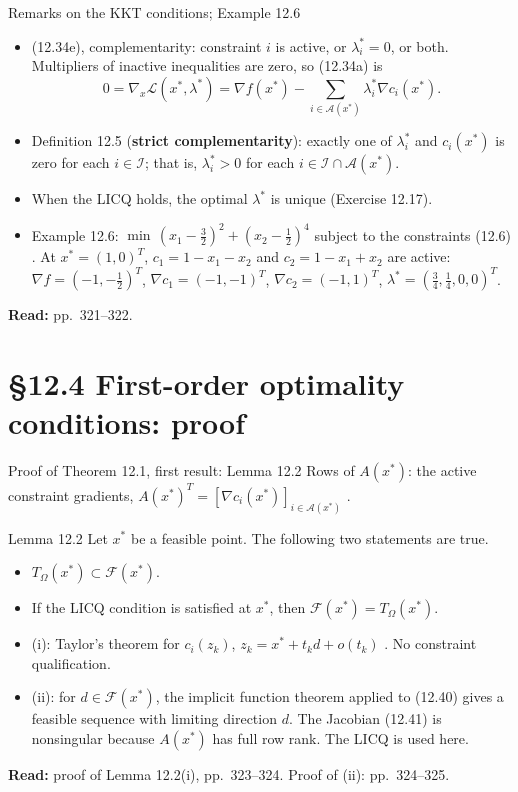 \documentclass[aspectratio=169,12pt]{beamer}
\newcommand{\xs}{x^{*}}
\newcommand{\gradf}{\nabla f}
\newcommand{\eqn}[1]{\text{\small(#1)}}
\newcommand{\readbook}[1]{{\color{red}\textbf{Read:} #1}}
\newcommand{\ls}{\lambda^{*}}
\newcommand{\cA}{\mathcal{A}}
\newcommand{\cF}{\mathcal{F}}
\newcommand{\cI}{\mathcal{I}}
\newcommand{\cL}{\mathcal{L}}
\newcommand{\TO}{T_{\Omega}}
\begin{document}
\begin{frame}{Remarks on the KKT conditions; Example 12.6}
  \begin{itemize}\setlength\itemsep{0.25em}
    \item (12.34e), complementarity: constraint $i$ is active, or $\ls_{i}=0$, or both. Multipliers of
      inactive inequalities are zero, so (12.34a) is
      \[ 0=\nabla_{x}\cL(\xs,\ls)=\gradf(\xs)-\sum_{i\in\cA(\xs)}\ls_{i}\nabla c_{i}(\xs) . \tag{12.35} \]
    \item Definition 12.5 (\textbf{strict complementarity}): exactly one of $\ls_{i}$ and $c_{i}(\xs)$
      is zero for each $i\in\cI$; that is, $\ls_{i}>0$ for each $i\in\cI\cap\cA(\xs)$.
    \item When the LICQ holds, the optimal $\ls$ is unique (Exercise 12.17).
    \item Example 12.6: $\min\,(x_{1}-\tfrac32)^{2}+(x_{2}-\tfrac12)^{4}$ subject to the constraints
      (12.6) \eqn{12.36}. At $\xs=(1,0)^{T}$,
      $c_{1}=1-x_{1}-x_{2}$ and $c_{2}=1-x_{1}+x_{2}$ are active:
      $\gradf=(-1,-\tfrac12)^{T}$, $\nabla c_{1}=(-1,-1)^{T}$, $\nabla c_{2}=(-1,1)^{T}$,
      $\ls=(\tfrac34,\tfrac14,0,0)^{T}$.
  \end{itemize}
  \readbook{pp.~321--322.}
\end{frame}

\section{\S12.4 First-order optimality conditions: proof}

\begin{frame}{Proof of Theorem 12.1, first result: Lemma 12.2}
  Rows of $A(\xs)$: the active constraint gradients,
  $A(\xs)^{T}=[\nabla c_{i}(\xs)]_{i\in\cA(\xs)}$ \eqn{12.37}.
  \begin{block}{Lemma 12.2}
    Let $\xs$ be a feasible point. The following two statements are true.
    \begin{itemize}
      \item[(i)] $\TO(\xs)\subset\cF(\xs)$.
      \item[(ii)] If the LICQ condition is satisfied at $\xs$, then $\cF(\xs)=\TO(\xs)$.
    \end{itemize}
  \end{block}
  \begin{itemize}\setlength\itemsep{0.25em}
    \item (i): Taylor's theorem for $c_{i}(z_{k})$, $z_{k}=\xs+t_{k}d+o(t_{k})$ \eqn{12.38}.
      No constraint qualification.\vspace{-0.15em}
    \item (ii): for $d\in\cF(\xs)$, the implicit function theorem applied to (12.40) gives a feasible
      sequence with limiting direction $d$. The Jacobian (12.41) is nonsingular because $A(\xs)$
      has full row rank. \alert{The LICQ is used here.}
  \end{itemize}
  \readbook{proof of Lemma 12.2(i), pp.~323--324.} Proof of (ii): pp.~324--325.
\end{frame}
\end{document}
